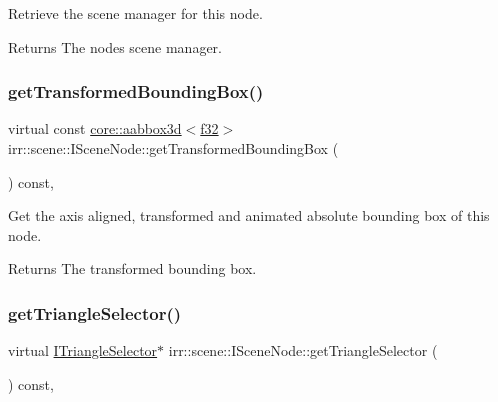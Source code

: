 Retrieve the scene manager for this node. 

\begin{DoxyReturn}{Returns}
The node\textquotesingle{}s scene manager. 
\end{DoxyReturn}
\mbox{\label{classirr_1_1scene_1_1ISceneNode_a77746edcc479107067fbf1f4471ab412}} 
\subsubsection{\texorpdfstring{get\+Transformed\+Bounding\+Box()}{getTransformedBoundingBox()}}
{\footnotesize\ttfamily virtual const \hyperlink{classirr_1_1core_1_1aabbox3d}{core\+::aabbox3d}$<$\hyperlink{namespaceirr_a0277be98d67dc26ff93b1a6a1d086b07}{f32}$>$ irr\+::scene\+::\+I\+Scene\+Node\+::get\+Transformed\+Bounding\+Box (\begin{DoxyParamCaption}{ }\end{DoxyParamCaption}) const\hspace{0.3cm}{\ttfamily [inline]}, {\ttfamily [virtual]}}



Get the axis aligned, transformed and animated absolute bounding box of this node. 

\begin{DoxyReturn}{Returns}
The transformed bounding box. 
\end{DoxyReturn}
\mbox{\label{classirr_1_1scene_1_1ISceneNode_ab820f7ccfdd317d3913316b6991ea5d9}} 
\subsubsection{\texorpdfstring{get\+Triangle\+Selector()}{getTriangleSelector()}}
{\footnotesize\ttfamily virtual \hyperlink{classirr_1_1scene_1_1ITriangleSelector}{I\+Triangle\+Selector}$\ast$ irr\+::scene\+::\+I\+Scene\+Node\+::get\+Triangle\+Selector (\begin{DoxyParamCaption}{ }\end{DoxyParamCaption}) const\hspace{0.3cm}{\ttfamily [inline]}, {\ttfamily [virtual]}}



